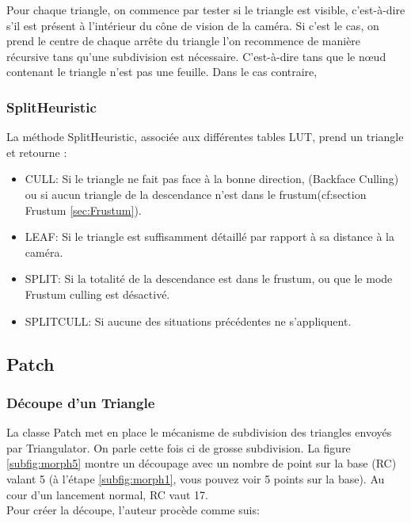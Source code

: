 	Pour chaque triangle, on commence par tester si le triangle est visible, c'est-à-dire s'il est
	présent à l'intérieur du cône de vision de la caméra. Si c'est le cas, on prend le centre de chaque
	arrête du triangle l'on recommence de manière récursive tans qu'une subdivision est nécessaire.
	C'est-à-dire tans que le n\oe{}ud contenant le triangle n'est pas une feuille. Dans le cas contraire,
	\fi	
	
	
    
	
	
	
	\subsubsection{SplitHeuristic}
	\label{sec:SplitHeuristic}
	La méthode SplitHeuristic, associée aux différentes tables LUT, prend un triangle et retourne :
	\begin{itemize} 
	\item CULL: 
	 \newline Si le triangle ne fait pas face à la bonne direction, (Backface Culling) ou si aucun triangle de la descendance n'est dans le frustum(cf:section Frustum \ref{sec:Frustum}).
	\item LEAF: 
	\newline Si le triangle est suffisamment détaillé par rapport à sa distance à la caméra.
	\item SPLIT: 
	\newline Si la totalité de la descendance est dans le frustum, ou que le mode Frustum culling est désactivé.
	\item SPLITCULL:
	\newline Si aucune des situations précédentes ne s'appliquent.
	\end{itemize}
	 
	

	
	
	\subsection{Patch}
	\subsubsection{Découpe d'un Triangle}
	La classe Patch met en place le mécanisme de subdivision des triangles envoyés par Triangulator. On parle cette fois ci de grosse subdivision. La figure \ref{subfig:morph5} montre un découpage avec un nombre de point sur la base (RC) valant 5 (à l'étape \ref{subfig:morph1}, vous pouvez voir 5 points sur la base). Au cour d'un lancement normal, RC vaut 17.\\
	Pour créer la découpe, l'auteur procède comme suis:

